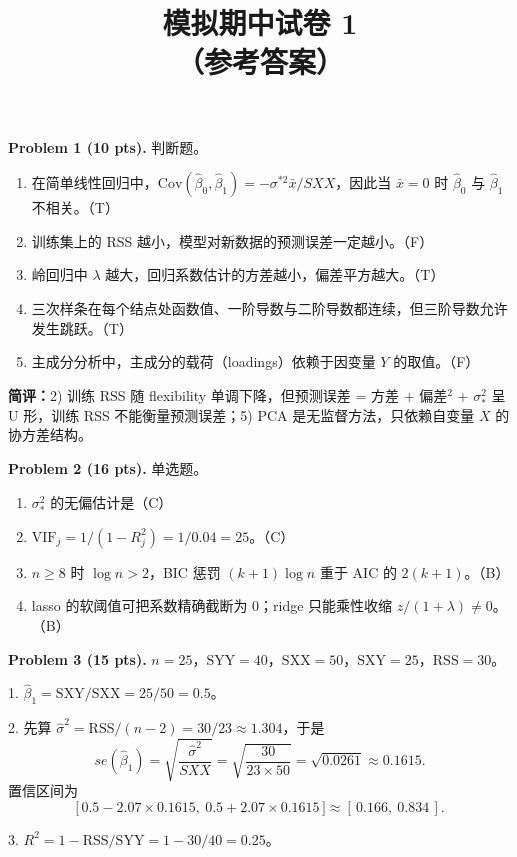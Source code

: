 \documentclass[11pt]{ctexart}
\title{\textbf{模拟期中试卷 1}\\[0.2em]
\large （参考答案）}
\author{}
\date{}
\newcommand{\ans}[1]{{\color{red}#1}}
\begin{document}
\maketitle
\vspace{-1.2cm}

\noindent\textbf{Problem 1 (10 pts).} 判断题。
\begin{enumerate}
\item 在简单线性回归中，$\mathrm{Cov}(\hat\beta_0, \hat\beta_1) = -\sigma^{*2}\bar{x}/SXX$，因此当 $\bar{x} = 0$ 时 $\hat\beta_0$ 与 $\hat\beta_1$ 不相关。\hfill\ans{（T）}
\item 训练集上的 RSS 越小，模型对新数据的预测误差一定越小。\hfill\ans{（F）}
\item 岭回归中 $\lambda$ 越大，回归系数估计的方差越小，偏差平方越大。\hfill\ans{（T）}
\item 三次样条在每个结点处函数值、一阶导数与二阶导数都连续，但三阶导数允许发生跳跃。\hfill\ans{（T）}
\item 主成分分析中，主成分的载荷（loadings）依赖于因变量 $Y$ 的取值。\hfill\ans{（F）}
\end{enumerate}

\ans{\textbf{简评：}2) 训练 RSS 随 flexibility 单调下降，但预测误差 = 方差 + 偏差$^2$ + $\sigma_*^2$ 呈 U 形，训练 RSS 不能衡量预测误差；5) PCA 是无监督方法，只依赖自变量 $X$ 的协方差结构。}

\noindent\textbf{Problem 2 (16 pts).} 单选题。
\begin{enumerate}
\item $\sigma_*^2$ 的无偏估计是\hfill\ans{（C）}
\item $\mathrm{VIF}_j = 1/(1-R_j^2) = 1/0.04 = 25$。\hfill\ans{（C）}
\item $n \geq 8$ 时 $\log n > 2$，BIC 惩罚 $(k+1)\log n$ 重于 AIC 的 $2(k+1)$。\hfill\ans{（B）}
\item lasso 的软阈值可把系数精确截断为 $0$；ridge 只能乘性收缩 $z/(1+\lambda) \neq 0$。\hfill\ans{（B）}
\end{enumerate}

\noindent\textbf{Problem 3 (15 pts).} $n = 25$，$\mathrm{SYY} = 40$，$\mathrm{SXX} = 50$，$\mathrm{SXY} = 25$，$\mathrm{RSS} = 30$。

\ans{
1. $\hat\beta_1 = \mathrm{SXY}/\mathrm{SXX} = 25/50 = 0.5$。

2. 先算 $\hat\sigma^2 = \mathrm{RSS}/(n-2) = 30/23 \approx 1.304$，于是
\[
se(\hat\beta_1) = \sqrt{\frac{\hat\sigma^2}{SXX}} = \sqrt{\frac{30}{23 \times 50}} = \sqrt{0.0261} \approx 0.1615.
\]
置信区间为
\[
\big[\,0.5 - 2.07 \times 0.1615,\ 0.5 + 2.07 \times 0.1615\,\big] \approx [\,0.166,\ 0.834\,].
\]

3. $R^2 = 1 - \mathrm{RSS}/\mathrm{SYY} = 1 - 30/40 = 0.25$。
}
\end{document}
